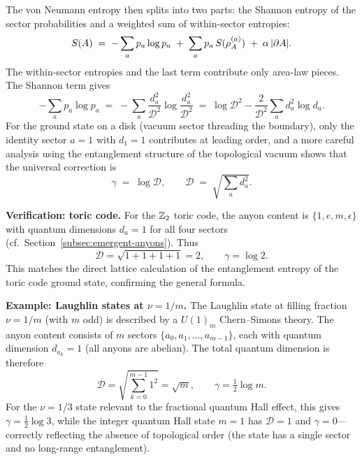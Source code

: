 The von Neumann entropy then splits into two parts: the Shannon entropy of the sector probabilities and a weighted sum of within-sector entropies:
\begin{equation}\label{eq:entropy-split}
    S(A) \;=\; -\sum_a p_a \log p_a \;+\; \sum_a p_a \, S(\rho_A^{(a)}) \;+\; \alpha\,|\partial A|.
\end{equation}
The within-sector entropies and the last term contribute only area-law pieces.  The Shannon term gives
\begin{equation}\label{eq:shannon-piece}
    -\sum_a p_a \log p_a \;=\; -\sum_a \frac{d_a^2}{\mathcal{D}^2} \log \frac{d_a^2}{\mathcal{D}^2} \;=\; \log \mathcal{D}^2 - \frac{2}{\mathcal{D}^2}\sum_a d_a^2 \log d_a.
\end{equation}
For the ground state on a disk (vacuum sector threading the boundary), only the identity sector $a = 1$ with $d_1 = 1$ contributes at leading order, and a more careful analysis using the entanglement structure of the topological vacuum shows that the universal correction is
\begin{equation}\label{eq:gamma-result}
    \gamma \;=\; \log \mathcal{D}, \qquad \mathcal{D} \;=\; \sqrt{\sum_a d_a^2}.
\end{equation}

\medskip
\noindent\textbf{Verification: toric code.}
For the $\mathbb{Z}_2$ toric code, the anyon content is $\{1, e, m, \epsilon\}$ with quantum dimensions $d_a = 1$ for all four sectors (cf.\ Section~\ref{subsec:emergent-anyons}).  Thus
\begin{equation}\label{eq:tee-toric-check}
    \mathcal{D} = \sqrt{1 + 1 + 1 + 1} = 2, \qquad \gamma = \log 2.
\end{equation}
This matches the direct lattice calculation of the entanglement entropy of the toric code ground state, confirming the general formula.

\medskip
\noindent\textbf{Example: Laughlin states at $\nu = 1/m$.}
The Laughlin state at filling fraction $\nu = 1/m$ (with $m$ odd) is described by a $U(1)_m$ Chern--Simons theory.  The anyon content consists of $m$ sectors $\{a_0, a_1, \ldots, a_{m-1}\}$, each with quantum dimension $d_{a_k} = 1$ (all anyons are abelian).  The total quantum dimension is therefore
\begin{equation}\label{eq:tee-laughlin}
    \mathcal{D} = \sqrt{\sum_{k=0}^{m-1} 1^2} = \sqrt{m}, \qquad \gamma = \tfrac{1}{2}\log m.
\end{equation}
For the $\nu = 1/3$ state relevant to the fractional quantum Hall effect, this gives $\gamma = \frac{1}{2}\log 3$, while the integer quantum Hall state $m = 1$ has $\mathcal{D} = 1$ and $\gamma = 0$---correctly reflecting the absence of topological order (the state has a single sector and no long-range entanglement).

